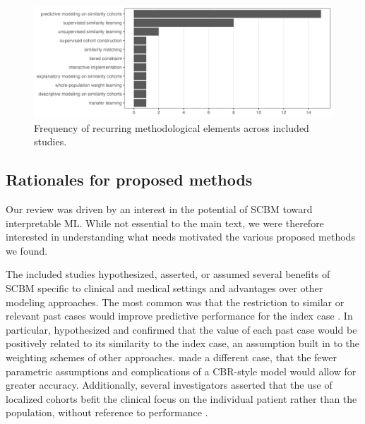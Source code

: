 \documentclass[sn-mathphys,Numbered,pdflatex]{sn-jnl}
\theoremstyle{remark}
\theoremstyle{definition}
\newcommand{\hl}[1]{#1}
\begin{document}
\begin{figure}

{\centering \includegraphics[width=1\linewidth]{Fig4} 

}

\caption{Frequency of recurring methodological elements across included studies.}\label{fig:methods}
\end{figure}

\subsection*{\texorpdfstring{Rationales\hl{ for proposed methods}}{Rationales}}\label{rationales}

\hl{Our review was driven by an interest in the potential of SCBM toward interpretable ML. While not essential to the main text, we were therefore interested in understanding what needs motivated the various proposed methods we found.}

The included studies hypothesized, asserted, or assumed several benefits
of \hl{SCBM} specific to clinical and medical settings and advantages
over other modeling approaches. The most common was that the restriction
to similar or relevant past cases would improve predictive performance
for the index case \citep{Mariuzzi1997, Liang2015, Ng2015, Lee2017}. In
particular, \citet{Lee2015} hypothesized and confirmed that the value of
each past case would be positively related to its similarity to the
index case, an assumption built in to the weighting schemes of other
approaches. \citet{Lowsky2013} made a different case, that the fewer
parametric assumptions and complications of a CBR-style model would
allow for greater accuracy. Additionally, several investigators asserted
that the use of localized cohorts befit the clinical focus on the
individual patient rather than the population, without reference to
performance \citep{Song2006, Xu2008}.
\end{document}

